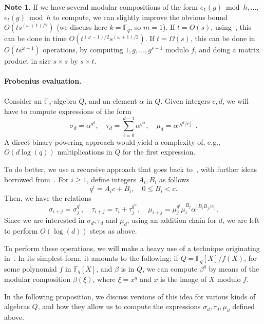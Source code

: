 \documentclass{mcom-l}
\theoremstyle{plain}
\theoremstyle{definition}
\newtheorem{note}[theorem]{Note}
\newcommand{\F}{\ensuremath{\mathbb{F}}}
\begin{document}
\begin{note}\label{note:multimc}
If we have several modular compositions of the form $e_1(g) \bmod
h,\dots,$ $e_t(g) \bmod h$ to compute, we can slightly improve the obvious
bound $O(ts^{(\omega+1)/2})$ (we discuss here $k=\F_q$, so $m=1$). If
$t=O(s)$, using~\cite[Lemma~4]{kaltofen+shoup98}, this can be done in
time $O(t^{(\omega-1)/2}s^{(\omega+1)/2})$. If $t=\Omega(s)$, this can
be done in $O(t s^{\omega-1})$ operations, by computing $1,g,\dots,g^{s-1}$
modulo $f$, and doing a matrix product in size $s \times s$ by
$s \times t$.
\end{note}

\paragraph{\bf Frobenius evaluation.} Consider an $\F_q$-algebra $Q$,
and an element $\alpha$ in $Q$. Given integers $c,d$, we will have to
compute expressions of the form
\[
\sigma_d= \alpha^{q^d}, \quad \tau_d = \sum_{i=0}^{d-1} \alpha^{q^{ci}}, \quad
\mu_d=\alpha^{\lfloor q^d/c\rfloor} \enspace .
\]
A direct binary powering approach
would yield a complexity of, e.g., $O(d\log(q))$ multiplications in $Q$
for the first expression.

To do better, we use a recursive approach that goes back
to~\cite{von1992computing}, with further ideas borrowed from~\cite{shoup94,kaltofen+shoup97}.
For $i \ge 1$, define integers $A_i, B_i$ as follows
\begin{equation*}
  q^i = A_ic + B_i, \quad 0\le B_i < c.
\end{equation*}
Then, we have the relations
$$\sigma_{i+j}=\sigma_j^{q^i}, \quad \tau_{i+j}=\tau_i +
\tau_j^{q^{ic}}, \quad \mu_{i+j}=\mu_j^{q^i}
\mu_i^{B_j}\alpha^{\lfloor B_iB_j / c \rfloor}.$$ Since we are
interested in $\sigma_d,\tau_d$ and $\mu_d$, using an addition chain
for $d$, we are left to perform $O(\log(d))$ steps as above.

To perform these operations, we will make a heavy use of a technique
originating in~\cite{von1992computing}. In its simplest form, it
amounts to the following: if $Q=\F_q[X]/f(X)$, for some polynomial $f$
in $\F_q[X]$, and $\beta$ is in $Q$, we can compute $\beta^{q}$ by
means of the modular composition $\beta(\xi)$, where $\xi = x^{q}$ and
$x$ is the image of $X$ modulo $f$.

In the following proposition, we discuss
versions of this idea for various kinds of algebras $Q$, and how they
allow us to compute the expressions $\sigma_d, \tau_d, \mu_d$ defined
above.
\end{document}
